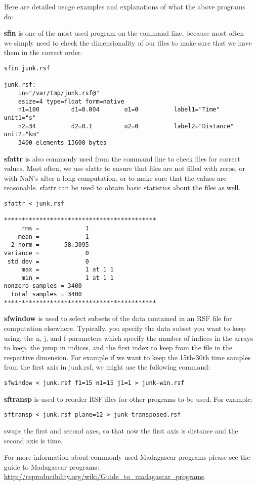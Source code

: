 Here are detailed usage examples and explanations of what the above programs do:

\textbf{sfin} is one of the most used program on the command line, because most often we simply need to check the dimensionality of our files to make sure that we have them in the correct order.
\begin{verbatim}
sfin junk.rsf
 
junk.rsf:
    in="/var/tmp/junk.rsf@"
    esize=4 type=float form=native 
    n1=100         d1=0.004       o1=0          label1="Time" unit1="s" 
    n2=34          d2=0.1         o2=0          label2="Distance" unit2="km" 
	3400 elements 13600 bytes
\end{verbatim}

\textbf{sfattr} is also commonly used from the command line to check files for correct values. Most often, we use sfattr to ensure that files are not filled with zeros, or with NaN's after a long computation, or to make sure that the values are reasonable. sfattr can be used to obtain basic statistics about the files as well.

\begin{verbatim}
sfattr < junk.rsf 
 
******************************************* 
     rms =             1 
    mean =             1 
  2-norm =       58.3095 
variance =             0 
 std dev =             0 
     max =             1 at 1 1 
     min =             1 at 1 1 
nonzero samples = 3400 
  total samples = 3400 
*******************************************
\end{verbatim}

\textbf{sfwindow} is used to select subsets of the data contained in an RSF file for computation elsewhere. Typically, you specify the data subset you want to keep using, the n, j, and f parameters which specify the number of indices in the arrays to keep, the jump in indices, and the first index to keep from the file in the respective dimension. For example if we want to keep the 15th-30th time samples from the first axis in junk.rsf, we might use the following command:
\begin{verbatim}
sfwindow < junk.rsf f1=15 n1=15 j1=1 > junk-win.rsf
\end{verbatim}

\textbf{sftransp} is used to reorder RSF files for other programs to be used. For example:
\begin{verbatim}
sftransp < junk.rsf plane=12 > junk-transposed.rsf
\end{verbatim}
swaps the first and second axes, so that now the first axis is distance and the second axis is time.

For more information about commonly used Madagascar programs please see the guide to Madagascar programs: \url{http://reproducibility.org/wiki/Guide_to_madagascar_programs}.


